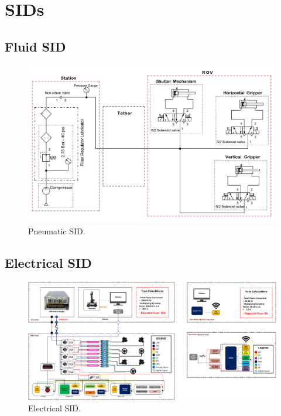 \section{SIDs} \label{app:sids}

\subsection{Fluid SID} \label{app:fluid_sid}

\begin{figure}[h!]
    \centering
    \includegraphics[width=\columnwidth]{Sections/7Appendicies/images/Pneumatic SID.jpg}
    \caption{Pneumatic SID.}
    \label{fig:pneumatic_sid}
\end{figure}

\subsection{Electrical SID}

\begin{figure}[h!]
    \centering
    \includegraphics[width=\columnwidth]{Sections/7Appendicies/images/electrical SID.png}
    \caption{Electrical SID.}
    \label{fig:electrical_sid}
\end{figure}
